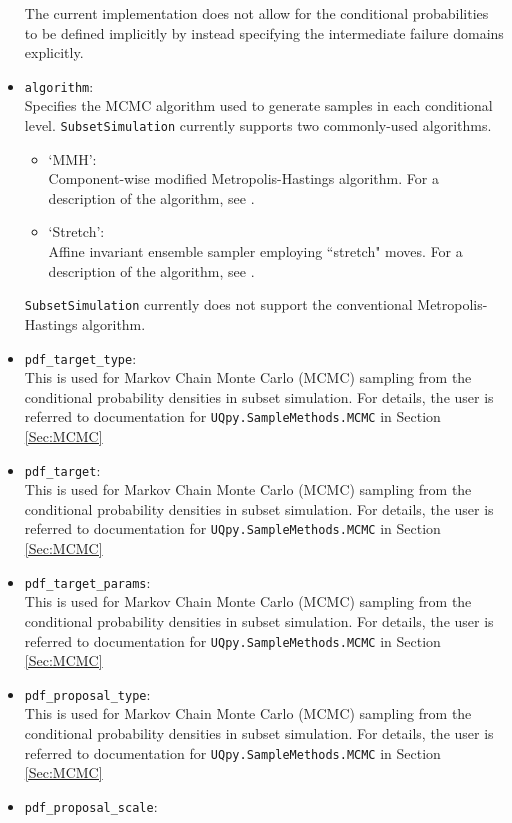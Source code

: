 \begin{itemize}
    The current implementation does not allow for the conditional probabilities to be defined implicitly by instead specifying the intermediate failure domains explicitly.
\item \texttt{algorithm}: \\ 
	Specifies the MCMC algorithm used to generate samples in each conditional level. \texttt{SubsetSimulation} currently supports two commonly-used algorithms.
	\begin{itemize}
		\item `MMH': \\ 
			Component-wise modified Metropolis-Hastings algorithm. For a description of the algorithm, see \cite{Au2001}. 
		\item `Stretch': \\ 
			Affine invariant ensemble sampler employing ``stretch" moves. For a description of the algorithm, see \cite{Goodman2010}.
	\end{itemize} 
    \texttt{SubsetSimulation} currently does not support the conventional Metropolis-Hastings algorithm.
\item \texttt{pdf\_target\_type}:\\ 
	This is used for Markov Chain Monte Carlo (MCMC) sampling from the conditional probability densities in subset simulation. For details, the user is referred to documentation for 		\texttt{UQpy.SampleMethods.MCMC} in Section \ref{Sec:MCMC}
\item \texttt{pdf\_target}:\\ 
	This is used for Markov Chain Monte Carlo (MCMC) sampling from the conditional probability densities in subset simulation. For details, the user is referred to documentation for 		\texttt{UQpy.SampleMethods.MCMC} in Section \ref{Sec:MCMC}
\item \texttt{pdf\_target\_params}:\\
	This is used for Markov Chain Monte Carlo (MCMC) sampling from the conditional probability densities in subset simulation. For details, the user is referred to documentation for 		\texttt{UQpy.SampleMethods.MCMC} in Section \ref{Sec:MCMC}
\item \texttt{pdf\_proposal\_type}:\\ 
	This is used for Markov Chain Monte Carlo (MCMC) sampling from the conditional probability densities in subset simulation. For details, the user is referred to documentation for 		\texttt{UQpy.SampleMethods.MCMC} in Section \ref{Sec:MCMC}
\item \texttt{pdf\_proposal\_scale}:\\ 

\end{itemize}
